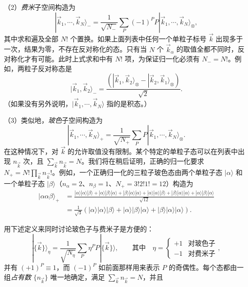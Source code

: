 （2）\emph{费米}子空间构造为
\begin{equation}\label{eq:7.6}
|\vec k_1,\cdots,\vec k_N\rangle_-=\frac1{\sqrt{N_-}}\sum_P(-1)^PP|\vec k_1,\cdots,\vec k_N\rangle_\otimes,
\end{equation}
其中求和遍及全部 $N!$ 个置换。如果上面列表中任何一个单粒子标号 $\vec k$ 出现多于一次，结果为零，不存在反对称化的态。只有当 $N$ 个 $\vec k_\alpha$ 的取值全都不同时，反对称化才有可能。此时上式求和中有 $N!$ 项，为保证归一化必须有 $N_-=N!$。例如，两粒子反对称态是
\begin{equation*}
|\vec k_1,\vec k_2\rangle_-=\frac{(|\vec k_1,\vec k_2\rangle_\otimes-|\vec k_2,\vec k_1\rangle_\otimes)}{\sqrt2}.
\end{equation*}
（如果没有另外说明，$|\vec k_1,\cdots,\vec k_N\rangle$ 指的是积态。）

（3）类似地，\emph{玻色}子空间构造为
\begin{equation}\label{eq:7.7}
|\vec k_1,\cdots,\vec k_N\rangle_+=\frac1{\sqrt{N_+}}\sum_PP|\vec k_1,\cdots,\vec k_N\rangle_\otimes.
\end{equation}
在这种情况下，对 $\vec k$ 的允许取值没有限制。某个特定的单粒子态可以在列表中出现 $n_{\vec k}$ 次，且 $\sum_{\vec k}n_{\vec k}=N$。我们将在稍后证明，正确的归一化要求 $N_+=N!\prod_{\vec k}n_{\vec k}!$。例如，一个正确归一化的三粒子玻色态由两个单粒子态 $|\alpha\rangle$ 和一个单粒子态 $|\beta\rangle$（$n_\alpha=2$、$n_\beta=1$、$N_+=3!2!1!=12$）构造为
\begin{align*}
|\alpha\alpha\beta\rangle_+&=\frac{|\alpha\rangle|\alpha\rangle|\beta\rangle+|\alpha\rangle|\beta\rangle|\alpha\rangle+|\beta\rangle|\alpha\rangle|\alpha\rangle+|\alpha\rangle|\alpha\rangle|\beta\rangle+|\beta\rangle|\alpha\rangle|\alpha\rangle+|\alpha\rangle|\beta\rangle|\alpha\rangle}{\sqrt{12}}\\
&=\frac1{\sqrt3}\left(|\alpha\rangle|\alpha\rangle|\beta\rangle+|\alpha\rangle|\beta\rangle|\alpha\rangle+|\beta\rangle|\alpha\rangle|\alpha\rangle\right).
\end{align*}

用下述定义来同时讨论玻色子与费米子是方便的：
\begin{equation}\label{eq:7.8}
|\{\vec k\}\rangle_\eta=\frac1{\sqrt{N_\eta}}\sum_P\eta^PP|\{\vec k\}\rangle,\qquad\text{其中}\quad\eta=\begin{cases}+1&\text{对玻色子}\\ -1&\text{对费米子}\end{cases},
\end{equation}
并有 $(+1)^P\equiv1$，而 $(-1)^P$ 如前面那样用来表示 $P$ 的奇偶性。每个态都由一组\emph{占有数} $\{n_{\vec k}\}$ 唯一地确定，满足 $\sum_{\vec k}n_{\vec k}=N$，并且


